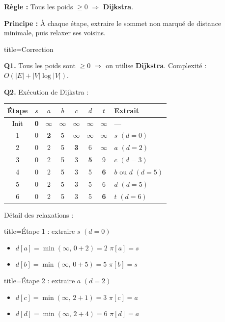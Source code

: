 \documentclass[12pt,a4paper]{article}
\begin{document}
\begin{methode}
\textbf{R\`egle :} Tous les poids $\geq 0$ $\Rightarrow$ \textbf{Dijkstra}.

\textbf{Principe :} \`A chaque \'etape, extraire le sommet non marqu\'e de distance minimale, puis relaxer ses voisins.
\end{methode}

\begin{correction}{title=Correction}

\textbf{Q1.} Tous les poids sont $\geq 0$ $\Rightarrow$ on utilise \textbf{Dijkstra}. Complexit\'e : $O(|E| + |V|\log|V|)$.

\medskip
\textbf{Q2.} Ex\'ecution de Dijkstra :

\begin{center}
\renewcommand{\arraystretch}{1.3}
\begin{tabular}{|c|c|c|c|c|c|c|l|}
\hline
\textbf{\'Etape} & $s$ & $a$ & $b$ & $c$ & $d$ & $t$ & \textbf{Extrait} \\\hline
Init & \textbf{0} & $\infty$ & $\infty$ & $\infty$ & $\infty$ & $\infty$ & --- \\\hline
1 & 0 & \textbf{2} & 5 & $\infty$ & $\infty$ & $\infty$ & $s$ $(d=0)$ \\\hline
2 & 0 & 2 & 5 & \textbf{3} & 6 & $\infty$ & $a$ $(d=2)$ \\\hline
3 & 0 & 2 & 5 & 3 & \textbf{5} & 9 & $c$ $(d=3)$ \\\hline
4 & 0 & 2 & 5 & 3 & 5 & \textbf{6} & $b\text{ ou }d$ $(d=5)$ \\\hline
5 & 0 & 2 & 5 & 3 & 5 & 6 & $d$ $(d=5)$ \\\hline
6 & 0 & 2 & 5 & 3 & 5 & \textbf{6} & $t$ $(d=6)$ \\\hline
\end{tabular}
\end{center}

D\'etail des relaxations :

\begin{etape}{title=\'Etape 1 : extraire $s$ $(d=0)$}
\begin{itemize}[nosep]
    \item $d[a] = \min(\infty,\, 0+2) = 2$ \quad $\pi[a]=s$
    \item $d[b] = \min(\infty,\, 0+5) = 5$ \quad $\pi[b]=s$
\end{itemize}
\end{etape}

\begin{etape}{title=\'Etape 2 : extraire $a$ $(d=2)$}
\begin{itemize}[nosep]
    \item $d[c] = \min(\infty,\, 2+1) = 3$ \quad $\pi[c]=a$
    \item $d[d] = \min(\infty,\, 2+4) = 6$ \quad $\pi[d]=a$
\end{itemize}
\end{etape}


\end{correction}
\end{document}

